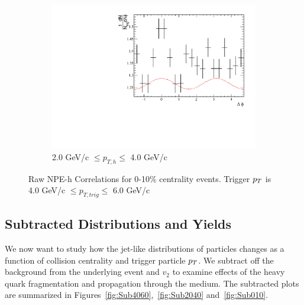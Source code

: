 \begin{figure}[htbp]
\begin{center}
\begin{subfigure}{0.5\textwidth}
		\includegraphics[width=\textwidth]{Plots/Correlations/raw/NPE_eh_corr_raw_primpt_4_5_cent_7_8_assopt_3_4.pdf}
		\caption{2.0 GeV/c $\leq p_{T,h} \leq$ 4.0 GeV/c}
		\label{fig:Raw010c}
	\end{subfigure}	
\end{center}
\caption[Raw Correlations 0-10\% Centrality]{Raw NPE-h Correlations for 0-10\% centrality events. Trigger $p_{T}$ is 4.0 GeV/c $\leq p_{T,trig} \leq$ 6.0 GeV/c}
\label{fig:Raw010}
\end{figure}

\subsection{Subtracted Distributions and Yields}

We now want to study how the jet-like distributions of particles changes as a function of collision centrality and trigger particle $p_{T}$. We subtract off the background from the underlying event and $v_2$ to examine effects of the heavy quark fragmentation and propagation through the medium. The subtracted plots are summarized in Figures~\ref{fig:Sub4060},~\ref{fig:Sub2040} and~\ref{fig:Sub010}.

